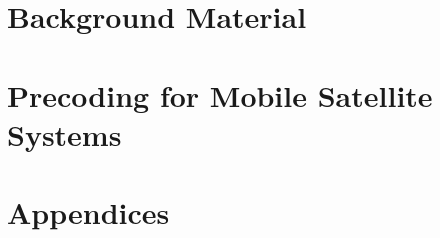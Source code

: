 \documentclass[11pt,a4paper,oneside]{book}
\begin{document}




\frontmatter






 
\cleardoublepage
{}
{}
\tableofcontents

\cleardoublepage
{}
{}
\listoffigures






\mainmatter

\part{Background Material}




\part{Precoding for Mobile Satellite Systems}




\appendix
\part{Appendices}




% 
% 
% 

 
\backmatter


\end{document}
